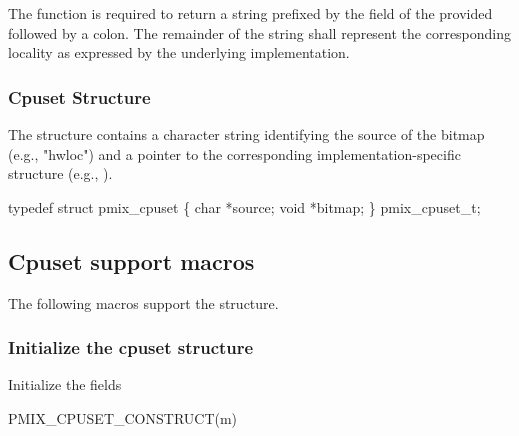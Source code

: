 The function is required to return a string prefixed by the  field of the provided  followed by a colon. The remainder of the string shall represent the corresponding locality as expressed by the underlying implementation.

\subsubsection{Cpuset Structure}

The  structure contains a character string identifying the source of the bitmap (e.g., "hwloc") and a pointer to the corresponding implementation-specific structure (e.g., ).

\cspecificstart
\begin{codepar}
typedef struct pmix_cpuset \{
    char *source;
    void *bitmap;
\} pmix_cpuset_t;
\end{codepar}
\cspecificend

\subsection{Cpuset support macros}
The following macros support the  structure.

\subsubsection{Initialize the cpuset structure}

Initialize the  fields

\cspecificstart
\begin{codepar}
PMIX_CPUSET_CONSTRUCT(m)
\end{codepar}
\cspecificend

\begin{arglist}
\end{arglist}


\subsection{}

\summary

